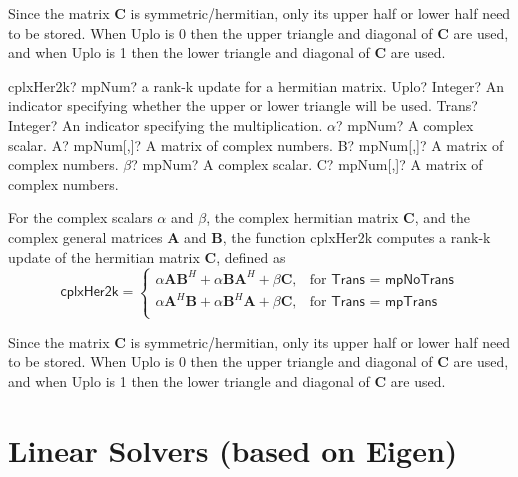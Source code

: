 Since the matrix $\boldsymbol{C}$ is symmetric/hermitian, only its upper half or lower half need to be stored. When \textsf{Uplo} is 0 then the upper triangle and diagonal of $\boldsymbol{C}$ are used, and when \textsf{Uplo} is 1 then the lower triangle and diagonal of $\boldsymbol{C}$ are used. 


\vspace{0.6cm}
\begin{mpFunctionsExtract}
	\mpFunctionSeven
	{cplxHer2k? mpNum? a rank-k update for a hermitian matrix.}
	{Uplo? Integer? An indicator specifying whether the upper or lower triangle will be used.}
	{Trans? Integer? An indicator specifying the multiplication.}
	{$\alpha$? mpNum? A complex scalar.}
	{A? mpNum[,]? A matrix of complex numbers.}
	{B? mpNum[,]? A matrix of complex numbers.}
	{$\beta$? mpNum? A complex scalar.}
	{C? mpNum[,]? A matrix of complex numbers.}
\end{mpFunctionsExtract}

\vspace{0.3cm}
For the complex scalars $\alpha$ and $\beta$, the complex hermitian matrix $\boldsymbol{C}$, and the complex general matrices $\boldsymbol{A}$ and $\boldsymbol{B}$, the function \textsf{cplxHer2k} computes a rank-k update of the hermitian matrix $\boldsymbol{C}$, defined as 
\begin{equation}
\textsf{cplxHer2k}=\begin{cases}
\alpha \boldsymbol{A} \boldsymbol{B}^H+ \alpha \boldsymbol{B} \boldsymbol{A}^H + \beta \boldsymbol{C}, & \text{for } \textsf{Trans = mpNoTrans} \\
\alpha \boldsymbol{A}^H \boldsymbol{B} + \alpha \boldsymbol{B}^H \boldsymbol{A} + \beta \boldsymbol{C}, & \text{for } \textsf{Trans = mpTrans} \\
\end{cases}
\end{equation}

Since the matrix $\boldsymbol{C}$ is symmetric/hermitian, only its upper half or lower half need to be stored. When \textsf{Uplo} is 0 then the upper triangle and diagonal of $\boldsymbol{C}$ are used, and when \textsf{Uplo} is 1 then the lower triangle and diagonal of $\boldsymbol{C}$ are used. 







\chapter{Linear Solvers (based on Eigen)}
\label{LinearAlgebraChapter} %

